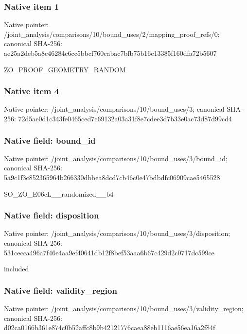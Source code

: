 \documentclass[10pt,a4paper]{article}
\begin{document}
\subsubsection{Native item 1}


Native pointer: /joint\_analysis/comparis\allowbreak{}ons/10/bound\_uses/2/mapp\allowbreak{}ing\_proof\_refs/0; canonical SHA-256: ae25a2deb5a8c46284c6cc5b\allowbreak{}bcf760cabac7bfb75b16c133\allowbreak{}85f160dfa72b5607


ZO\_PROOF\_GEOMETRY\_RANDOM


\subsubsection{Native item 4}


Native pointer: /joint\_analysis/comparis\allowbreak{}ons/10/bound\_uses/3; canonical SHA-256: 72d5ae0d1c343fe0465ced7c\allowbreak{}69132a03a31f8e7cdee3d7b3\allowbreak{}3e0ac73d87d99cd4



\subsubsection{Native field: bound\_id}


Native pointer: /joint\_analysis/comparis\allowbreak{}ons/10/bound\_uses/3/boun\allowbreak{}d\_id; canonical SHA-256: 5a9c1f3c852365964b266330\allowbreak{}dbbea8dcd7cb46c0e47bdbdf\allowbreak{}c06909cae5465528


SO\_ZO\_E06cL\_\_randomized\_\_b4


\subsubsection{Native field: disposition}


Native pointer: /joint\_analysis/comparis\allowbreak{}ons/10/bound\_uses/3/disp\allowbreak{}osition; canonical SHA-256: 531cecca496a7f46e4aa9ef4\allowbreak{}0641db12f8bef53aaa6b67c4\allowbreak{}29d2c0717dc599ce


included


\subsubsection{Native field: validity\_region}


Native pointer: /joint\_analysis/comparis\allowbreak{}ons/10/bound\_uses/3/vali\allowbreak{}dity\_region; canonical SHA-256: d02ca0166b361e874c0b52af\allowbreak{}fc8b9b42121776caea88eb11\allowbreak{}16ae56ea16a2f84f
\end{document}
